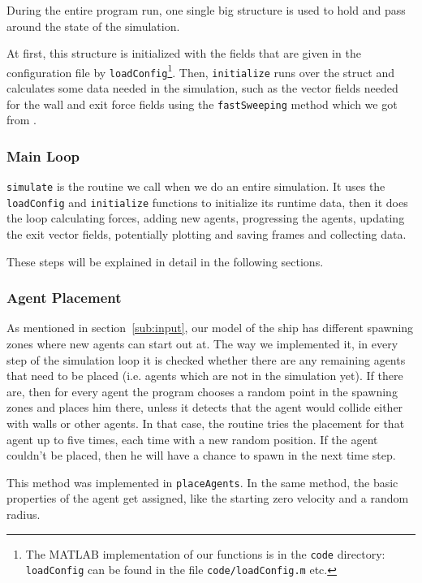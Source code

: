 \documentclass[11pt]{article}
\begin{document}
During the entire program run, one single big structure is used to hold and
pass around the state of the simulation.

At first, this structure is initialized with the fields that are given in the
configuration file by \texttt{loadConfig}\footnote{The MATLAB implementation of
our functions is in the \texttt{code} directory: \texttt{loadConfig} can be
found in the file \texttt{code/loadConfig.m} etc.}.  Then, \texttt{initialize} runs
over the struct and calculates some data needed in the simulation, such as the
vector fields needed for the wall and exit force fields using the
\texttt{fastSweeping} method which we got from \cite{multilevel}.

\subsubsection{Main Loop}

\texttt{simulate} is the routine we call when we do an entire simulation.  It
uses the \texttt{loadConfig} and \texttt{initialize} functions to initialize
its runtime data, then it does the loop calculating forces, adding new agents,
progressing the agents, updating the exit vector fields, potentially plotting
and saving frames and collecting data.

These steps will be explained in detail in the following sections.

\subsubsection{Agent Placement}

As mentioned in section~\ref{sub:input}, our model of the ship has different
spawning zones where new agents can start out at.  The way we implemented it,
in every step of the simulation loop it is checked whether there are any
remaining agents that need to be placed (i.e. agents which are not in the
simulation yet).  If there are, then for every agent the program chooses a
random point in the spawning zones and places him there, unless it detects that
the agent would collide either with walls or other agents.  In that case, the
routine tries the placement for that agent up to five times, each time with a
new random position.  If the agent couldn't be placed, then he will have a
chance to spawn in the next time step.

This method was implemented in \texttt{placeAgents}.  In the same method, the
basic properties of the agent get assigned, like the starting zero velocity and
a random radius.
\end{document}

